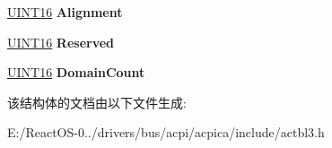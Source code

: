 \begin{DoxyCompactItemize}
\hyperlink{_processor_bind_8h_a09f1a1fb2293e33483cc8d44aefb1eb1}{U\+I\+N\+T16} {\bfseries Alignment}
\item 
\mbox{\label{structacpi__pmtt__controller_ac6ebaf9e8948154a9acef8473442b595}} 
\hyperlink{_processor_bind_8h_a09f1a1fb2293e33483cc8d44aefb1eb1}{U\+I\+N\+T16} {\bfseries Reserved}
\item 
\mbox{\label{structacpi__pmtt__controller_a96f5d11dd6797f9758bc72a4127f8137}} 
\hyperlink{_processor_bind_8h_a09f1a1fb2293e33483cc8d44aefb1eb1}{U\+I\+N\+T16} {\bfseries Domain\+Count}
\end{DoxyCompactItemize}


该结构体的文档由以下文件生成\+:\begin{DoxyCompactItemize}
\item 
E\+:/\+React\+O\+S-\/0../drivers/bus/acpi/acpica/include/actbl3.\+h\end{DoxyCompactItemize}
